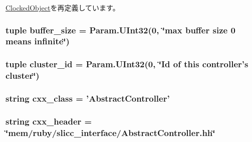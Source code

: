 \hyperlink{classClockedObject_1_1ClockedObject_a17fa61ac3806b481cafee5593b55e5d0}{ClockedObject}を再定義しています。\hypertarget{classController_1_1RubyController_a0f14097399fa367505d7d06197f1498c}{
\subsubsection[{buffer\_\-size}]{\setlength{\rightskip}{0pt plus 5cm}tuple {\bf buffer\_\-size} = Param.UInt32(0, \char`\"{}max buffer size 0 means infinite\char`\"{})}}
\label{classController_1_1RubyController_a0f14097399fa367505d7d06197f1498c}
\hypertarget{classController_1_1RubyController_a6687b3756ef466b810c9d374a2ee6bd6}{
\subsubsection[{cluster\_\-id}]{\setlength{\rightskip}{0pt plus 5cm}tuple {\bf cluster\_\-id} = Param.UInt32(0, \char`\"{}Id of this controller's cluster\char`\"{})}}
\label{classController_1_1RubyController_a6687b3756ef466b810c9d374a2ee6bd6}
\hypertarget{classController_1_1RubyController_a58cd55cd4023648e138237cfc0822ae3}{
\subsubsection[{cxx\_\-class}]{\setlength{\rightskip}{0pt plus 5cm}string {\bf cxx\_\-class} = '{\bf AbstractController}'}}
\label{classController_1_1RubyController_a58cd55cd4023648e138237cfc0822ae3}
\hypertarget{classController_1_1RubyController_a17da7064bc5c518791f0c891eff05fda}{
\subsubsection[{cxx\_\-header}]{\setlength{\rightskip}{0pt plus 5cm}string {\bf cxx\_\-header} = \char`\"{}mem/ruby/slicc\_\-interface/AbstractController.hh\char`\"{}}}
\label{classController_1_1RubyController_a17da7064bc5c518791f0c891eff05fda}


